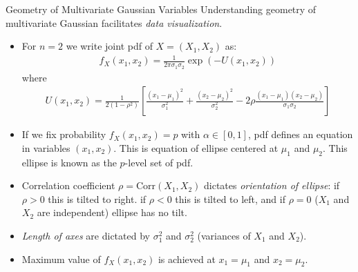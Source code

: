 \documentclass[9pt]{beamer}
\begin{document}
%
\begin{frame}{Geometry of Multivariate Gaussian Variables}
Understanding geometry of multivariate Gaussian facilitates {\em data visualization}.  

\begin{itemize}
\item For $n=2$ we write joint pdf of $X=(X_1,X_2)$ as:
\begin{align*}
f_X(x_1,x_2)=\frac{1}{2\pi\sigma_1\sigma_2}\exp\left(-U(x_1,x_2)\right)
\end{align*}
where 
\begin{align*}
U(x_1,x_2)=\frac{1}{2(1-\rho^2)}\left[\frac{(x_1-\mu_1)^2}{\sigma_1^2}+\frac{(x_2-\mu_2)^2}{\sigma_2^2}-2\rho\frac{(x_1-\mu_1)(x_2-\mu_2)}{\sigma_1\sigma_2}\right]
\end{align*}

\item If we fix probability $f_X(x_1,x_2)=p$ with $\alpha\in [0,1]$, pdf defines an equation in variables $(x_1,x_2)$.  This is equation of ellipse centered at $\mu_1$ and $\mu_2$.  This ellipse is known as the $p$-level set of pdf.  

\item Correlation coefficient $\rho=\textrm{Corr}(X_1,X_2)$ dictates {\em orientation of ellipse}: if $\rho>0$ this is tilted to right. if $\rho<0$ this is tilted to  left, and if $\rho=0$ ($X_1$ and $X_2$ are independent) ellipse has no tilt. 

\item {\em Length of axes} are dictated by $\sigma_1^2$ and $\sigma_2^2$ (variances of $X_1$ and $X_2$).

\item Maximum value of $f_X(x_1,x_2)$ is achieved at $x_1=\mu_1$ and $x_2=\mu_2$. 

\end{itemize}

\end{frame}
\end{document}
